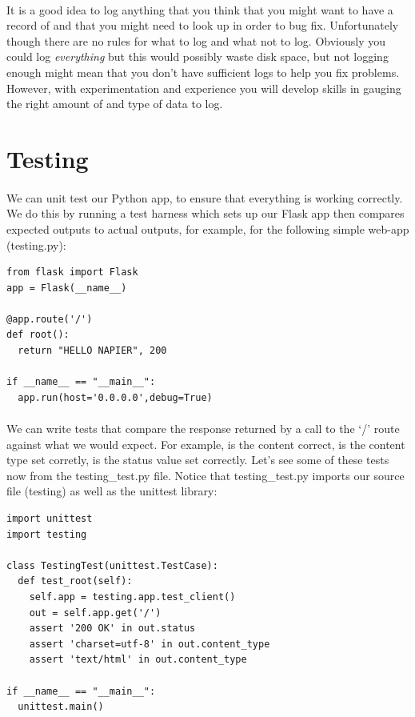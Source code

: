 \documentclass[12pt, a4paper, oneside]{book}
\begin{document}
\paragraph{} It is a good idea to log anything that you think that you might want to have a record of and that you might need to look up in order to bug fix. Unfortunately though there are no rules for what to log and what not to log. Obviously you could log \emph{everything} but this would possibly waste disk space, but not logging enough might mean that you don't have sufficient logs to help you fix problems. However, with experimentation and experience you will develop skills in gauging the right amount of and type of data to log.

\section{Testing}
\label{testing}
\paragraph{} We can unit test our Python app, to ensure that everything is working correctly. We do this by running a test harness which sets up our Flask app then compares expected outputs to actual outputs, for example, for the following simple web-app (testing.py):

\begin{lstlisting}
from flask import Flask
app = Flask(__name__)

@app.route('/')
def root():
  return "HELLO NAPIER", 200

if __name__ == "__main__":
  app.run(host='0.0.0.0',debug=True)
\end{lstlisting}

\paragraph{} We can write tests that compare the response returned by a call to the `/' route against what we would expect. For example, is the content correct, is the content type set corretly, is the status value set correctly. Let's see some of these tests now from the testing\_test.py file. Notice that testing\_test.py imports our source file (testing) as well as the unittest library:

\begin{lstlisting}
import unittest
import testing

class TestingTest(unittest.TestCase):
  def test_root(self):
    self.app = testing.app.test_client()
    out = self.app.get('/')
    assert '200 OK' in out.status
    assert 'charset=utf-8' in out.content_type
    assert 'text/html' in out.content_type

if __name__ == "__main__":
  unittest.main()
\end{lstlisting}
\end{document}
